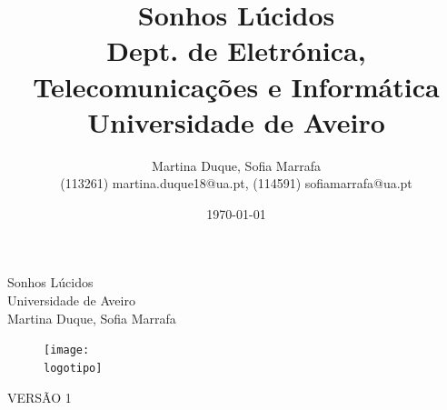 \documentclass{report}
\begin{document}
%
\def\titulo{Sonhos Lúcidos}
\def\data{Novembro 2022}
\def\autores{Martina Duque, Sofia Marrafa}
\def\autorescontactos{(113261) martina.duque18@ua.pt, (114591) sofiamarrafa@ua.pt}
\def\versao{VERSÃO 1}
\def\departamento{Dept. de Eletrónica, Telecomunicações e Informática}
\def\empresa{Universidade de Aveiro}
\def\logotipo{ua.pdf}
%
%
\begin{titlepage}

\begin{center}
%
\vspace*{50mm}
%
{\Huge \titulo}\\ 
%
\vspace{10mm}
%
{\Large \empresa}\\
%
\vspace{10mm}
%
{\LARGE \autores}\\ 
%
\vspace{30mm}
%
\begin{figure}[h]
\center
\texttt{[image: \\logotipo]}
\end{figure}
%
\vspace{30mm}
\end{center}
%
\begin{flushright}
\versao
\end{flushright}
\end{titlepage}

\title{%
{\Huge\textbf{\titulo}}\\
{\Large \departamento\\ \empresa}
}
%
\author{%
    \autores \\
    \autorescontactos
}
%
\date{\today}
%
\maketitle

\end{document}
